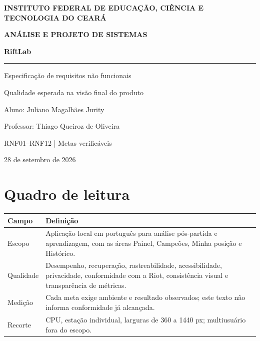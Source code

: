 \documentclass[12pt,a4paper]{article}
\begin{document}
\begin{titlepage}
  \setlength{\parindent}{0pt}\raggedright
  {\normalsize\bfseries INSTITUTO FEDERAL DE EDUCAÇÃO, CIÊNCIA E\\ TECNOLOGIA DO CEARÁ\par}
  \vspace*{2.0cm}
  {\Large\bfseries ANÁLISE E PROJETO DE SISTEMAS\par}
  \vspace{1.7cm}
  {\Huge\bfseries RiftLab\par}
  \vspace{0.4cm}
  {\rule{9cm}{1pt}\par}
  \vspace{0.7cm}
  {\LARGE Especificação de requisitos não funcionais\par}
  \vspace{0.5cm}
  {\large Qualidade esperada na visão final do produto\par}
  \vspace{1.6cm}
  {\large Aluno: Juliano Magalhães Jurity\par}
  \vspace{0.3cm}
  {\large Professor: Thiago Queiroz de Oliveira\par}
  \vfill
  {\large RNF01--RNF12 \quad | \quad Metas verificáveis\par}
  \vspace{0.3cm}
  {28 de setembro de 2026\par}
\end{titlepage}

\section*{Quadro de leitura}
\begin{center}
\begin{tabular}{@{}p{3.4cm}p{10.3cm}@{}}
\toprule
\bfseries Campo & \bfseries Definição \\
\midrule
Escopo & Aplicação local em português para análise pós-partida e aprendizagem, com as áreas Painel, Campeões, Minha posição e Histórico. \\
Qualidade & Desempenho, recuperação, rastreabilidade, acessibilidade, privacidade, conformidade com a Riot, consistência visual e transparência de métricas. \\
Medição & Cada meta exige ambiente e resultado observados; este texto não informa conformidade já alcançada. \\
Recorte & CPU, estação individual, larguras de 360 a 1440 px; multiusuário fora do escopo. \\
\bottomrule
\end{tabular}
\end{center}
\clearpage
\end{document}
